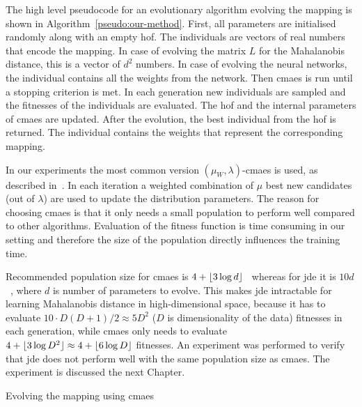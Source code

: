 \documentclass[12pt,a4paper]{report}
\begin{document}
The high level pseudocode for an evolutionary algorithm evolving the mapping is shown in Algorithm~\ref{pseudo:our-method}. First, all parameters are initialised randomly along with an empty \ac{hof}. The individuals are vectors of real numbers that encode the mapping. In case of evolving the matrix $L$ for the Mahalanobis distance, this is a vector of $d^2$ numbers. In case of evolving the neural networks, the individual contains all the weights from the network. Then \ac{cmaes} is run until a stopping criterion is met. In each generation new individuals are sampled and the fitnesses of the individuals are evaluated. The \ac{hof} and the internal parameters of \ac{cmaes} are updated. After the evolution, the best individual from the \ac{hof} is returned. The individual contains the weights that represent the corresponding mapping.

In our experiments the most common version $(\mu_W, \lambda)$-\ac{cmaes} is used, as described in~\citep{hansen2001completely}. In each iteration a weighted combination of $\mu$ best new candidates (out of $\lambda$) are used to update the distribution parameters. The reason for choosing \ac{cmaes} is that it only needs a small population to perform well compared to other algorithms. Evaluation of the fitness function is time consuming in our setting and therefore the size of the population directly influences the training time.

Recommended population size for \ac{cmaes} is $4+\lfloor3\log{d}\rfloor$~\citep{hansen2006cma} whereas for \ac{jde} it is $10d$~\citep{brest2006self}, where $d$ is number of parameters to evolve. This makes \ac{jde} intractable for learning Mahalanobis distance in high-dimensional space, because it has to evaluate $10\cdot D(D+1)/2 \approx 5D^2$ ($D$ is dimensionality of the data) fitnesses in each generation, while \ac{cmaes} only needs to evaluate $4+\lfloor3\log{D^2}\rfloor \approx 4+\lfloor6\log{D}\rfloor$ fitnesses. An experiment was performed to verify that \ac{jde} does not perform well with the same population size as \ac{cmaes}. The experiment is discussed the next Chapter.

\begin{algorithm}[t]
\caption{Evolving the mapping using \ac{cmaes}} \label{pseudo:our-method}
\DontPrintSemicolon
\LinesNumbered
{}
\end{algorithm} 
\end{document}
